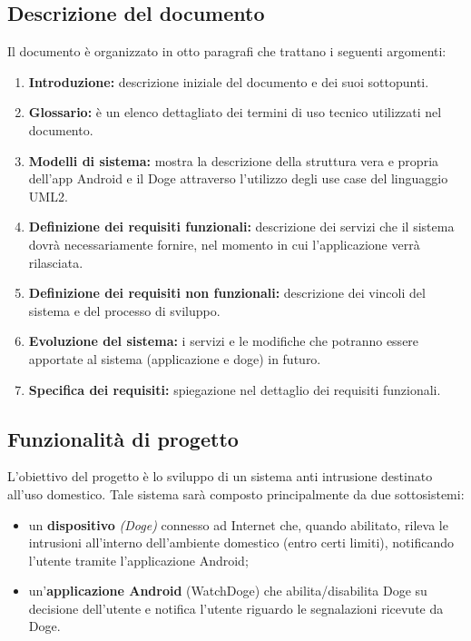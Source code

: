 \documentclass{article}
\begin{document}
    \subsection{Descrizione del documento}
    
    Il documento è organizzato in otto paragrafi che trattano i seguenti argomenti:
    
    \begin{enumerate}
    \item \textbf{Introduzione:} descrizione iniziale del documento e dei suoi sottopunti.
    \item \textbf{Glossario:} è un elenco dettagliato dei termini di uso tecnico utilizzati nel documento.
    \item \textbf{Modelli di sistema:} mostra la descrizione della struttura vera e propria dell’app Android e il Doge attraverso l’utilizzo degli use case del linguaggio UML2.
    \item \textbf{Definizione dei requisiti funzionali:} descrizione dei servizi che il sistema dovrà necessariamente fornire, nel momento in cui l’applicazione verrà rilasciata.
    \item \textbf{Definizione dei requisiti non funzionali:} descrizione dei vincoli del sistema e del processo di sviluppo.
    \item \textbf{Evoluzione del sistema:} i servizi e le modifiche che potranno essere apportate al sistema (applicazione e doge) in futuro.
    \item \textbf{Specifica dei requisiti:} spiegazione nel dettaglio dei requisiti funzionali.
    \end{enumerate}
    
    \subsection{Funzionalità di progetto}
    
    L'obiettivo del progetto è lo sviluppo di un sistema anti intrusione destinato all'uso domestico.
    Tale sistema sarà composto principalmente da due sottosistemi:
    \begin{itemize}
    \item un \textbf{dispositivo} \textit{(Doge)} connesso ad Internet che, quando abilitato, rileva le intrusioni all'interno dell'ambiente domestico (entro certi limiti), notificando l'utente tramite l'applicazione Android;
    \item un'\textbf{applicazione Android} (WatchDoge) che abilita/disabilita Doge su decisione dell'utente e notifica l'utente riguardo le segnalazioni ricevute da Doge.
    \end{itemize}
    
\end{document}
